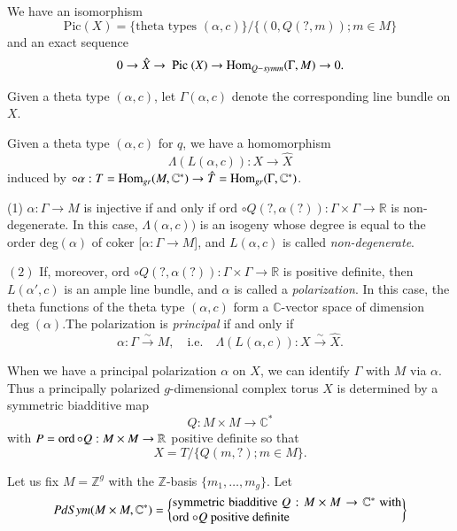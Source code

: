 \setcounter{prop}{2}
\begin{prop}\label{chap2:prop11.3}
We have an isomorphism 
$$
\text{Pic}(X) = \{\text{theta types } (\alpha, c) \} /\{ (0, Q (?,
m)) ; m \in M \}  
$$
and an exact sequence 
$$
0 \to \hat{X} \to \text{ Pic }(X) \to \operatorname{Hom}_{Q-symm} (\Gamma,
M) \to 0. 
$$
\end{prop}

Given a theta type $(\alpha, c)$, let $\Gamma (\alpha, c)$ denote the
corresponding line bundle on $X$. 

\begin{prop}\label{chap2:prop11.4}
Given a theta type $(\alpha, c)$ for $q$, we have a homomorphism
$$
\Lambda (L (\alpha, c)) : X \to \hat{X} 
$$
induced by $\circ \alpha : T = \operatorname{Hom}_{gr}(M, \mathbb{C}^*) \to
\hat{T} =  \operatorname{Hom}_{gr} (\Gamma, \mathbb{C}^*)$.  
\end{prop}

\noindent
 (1) $\alpha : \Gamma \to M$ is injective if and only if ord $\circ
Q(?, \alpha (?)) : \Gamma \times \Gamma \to \mathbb{R}$ is
non-degenerate. In this case, $\Lambda(\alpha, c))$ is an isogeny
whose degree is equal to the order deg$(\alpha)$ of coker [$ \alpha :
  \Gamma \to M$], and $L (\alpha, c)$ is called \textit{
  non-degenerate}. 

\noindent
$(2)$ If, moreover, ord $\circ Q (?, \alpha (?)) : \Gamma \times \Gamma \to
\mathbb{R}$ is positive definite, then $L (\alpha', c)$ is an ample
line bundle, and $\alpha$ is called a \textit{polarization}. In this
case, the theta functions of the theta type $(\alpha, c)$ form a
$\mathbb{C}$-vector space of dimension $\deg (\alpha)$.\pageoriginale The
polarization is \textit{principal} if and only if  
$$
\alpha : \Gamma \overset{\sim}{\to}M, \quad \text{i.e.} \quad \Lambda
(L(\alpha, c)) : X \overset{\sim}{\to} \hat{X}.  
$$

When we have a principal polarization $\alpha$ on $X$, we can identify
$\Gamma$ with $M$ via $\alpha$. Thus a principally polarized
$g$-dimensional complex torus $X$ is determined by a symmetric
biadditive map 
$$
Q : M \times M \to \mathbb{C}^* 
$$
with $P = \operatorname{ord} \circ Q : M \times M \to \mathbb{R}$ positive
definite so that 
$$
X = T/ \{ Q (m, ? ) ; m \in M \}.  
$$


Let us fix $M = \mathbb{Z}^g$ with the $\mathbb{Z}$-basis $\{m_1,
\ldots , m_g \}$. Let  
\begin{equation*}
PdSym (M \times M, \mathbb{C}^*) =  \left\{
\begin{minipage}{6.5cm}{
 symmetric biadditive  $Q : M \times M \to \mathbb{C}^*$ 
with ord $\circ Q $ positive definite}
 \end{minipage}
 \right \}
\end{equation*}


